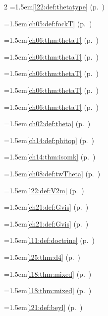 \begin{multicols}{2}
\hangindent=1.5em\quad \ref{l22:def:thetatype} (p.~\pageref{l22:def:thetatype})\par
\hangindent=1.5em\quad \ref{ch05:def:fockT} (p.~\pageref{ch05:def:fockT})\par
\hangindent=1.5em\quad \ref{ch06:thm:thetaT} (p.~\pageref{ch06:thm:thetaT})\par
\hangindent=1.5em\quad \ref{ch06:thm:thetaT} (p.~\pageref{ch06:thm:thetaT})\par
\hangindent=1.5em\quad \ref{ch06:thm:thetaT} (p.~\pageref{ch06:thm:thetaT})\par
\hangindent=1.5em\quad \ref{ch06:thm:thetaT} (p.~\pageref{ch06:thm:thetaT})\par
\hangindent=1.5em\quad \ref{ch06:thm:thetaT} (p.~\pageref{ch06:thm:thetaT})\par
\hangindent=1.5em\quad \ref{ch02:def:theta} (p.~\pageref{ch02:def:theta})\par
\hangindent=1.5em\quad \ref{ch14:def:phitop} (p.~\pageref{ch14:def:phitop})\par
\hangindent=1.5em\quad \ref{ch14:thm:isomk} (p.~\pageref{ch14:thm:isomk})\par
\hangindent=1.5em\quad \ref{ch08:def:twTheta} (p.~\pageref{ch08:def:twTheta})\par
\hangindent=1.5em\quad \ref{l22:def:V2m} (p.~\pageref{l22:def:V2m})\par
\hangindent=1.5em\quad \ref{ch21:def:Gvis} (p.~\pageref{ch21:def:Gvis})\par
\hangindent=1.5em\quad \ref{ch21:def:Gvis} (p.~\pageref{ch21:def:Gvis})\par
\hangindent=1.5em\quad \ref{l11:def:doctrine} (p.~\pageref{l11:def:doctrine})\par
\hangindent=1.5em\quad \ref{l25:thm:d4} (p.~\pageref{l25:thm:d4})\par
\hangindent=1.5em\quad \ref{l18:thm:mixed} (p.~\pageref{l18:thm:mixed})\par
\hangindent=1.5em\quad \ref{l18:thm:mixed} (p.~\pageref{l18:thm:mixed})\par
\hangindent=1.5em\quad \ref{l21:def:beyl} (p.~\pageref{l21:def:beyl})\par

\end{multicols}
